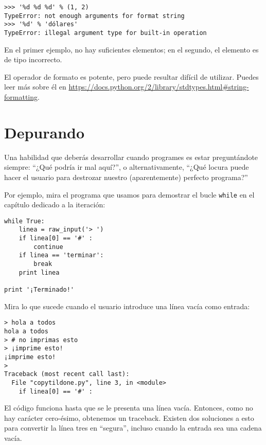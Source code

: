 
\beforeverb
\begin{verbatim}
>>> '%d %d %d' % (1, 2)
TypeError: not enough arguments for format string
>>> '%d' % 'dólares'
TypeError: illegal argument type for built-in operation
\end{verbatim}
\afterverb
%
En el primer ejemplo, no hay suficientes elementos; en el
segundo, el elemento es de tipo incorrecto.

El operador de formato es potente, pero puede resultar difícil de utilizar.
Puedes leer más sobre él en
\url{https://docs.python.org/2/library/stdtypes.html#string-formatting}.




\section{Depurando}

Una habilidad que deberás desarrollar cuando programes es
estar preguntándote siempre: ``¿Qué podría ir mal aquí?'', o alternativamente,
``¿Qué locura puede hacer el usuario para destrozar nuestro (aparentemente)
perfecto programa?''

Por ejemplo, mira el programa que usamos para demostrar el bucle
{\tt while} en el capítulo dedicado a la iteración:

\beforeverb
\begin{verbatim}
while True:
    linea = raw_input('> ')
    if linea[0] == '#' :
        continue
    if linea == 'terminar':
        break
    print linea

print '¡Terminado!'
\end{verbatim}
\afterverb
%
Mira lo que sucede cuando el usuario introduce una línea vacía como entrada:

\beforeverb
\begin{verbatim}
> hola a todos
hola a todos
> # no imprimas esto
> ¡imprime esto!
¡imprime esto!
> 
Traceback (most recent call last):
  File "copytildone.py", line 3, in <module>
    if linea[0] == '#' :
\end{verbatim}
\afterverb
%
El código funciona hasta que se le presenta una línea vacía. Entonces,
como no hay carácter cero-ésimo, obtenemos un traceback. Existen dos
soluciones a esto para convertir la línea tres en ``segura'', incluso
cuando la entrada sea una cadena vacía.

